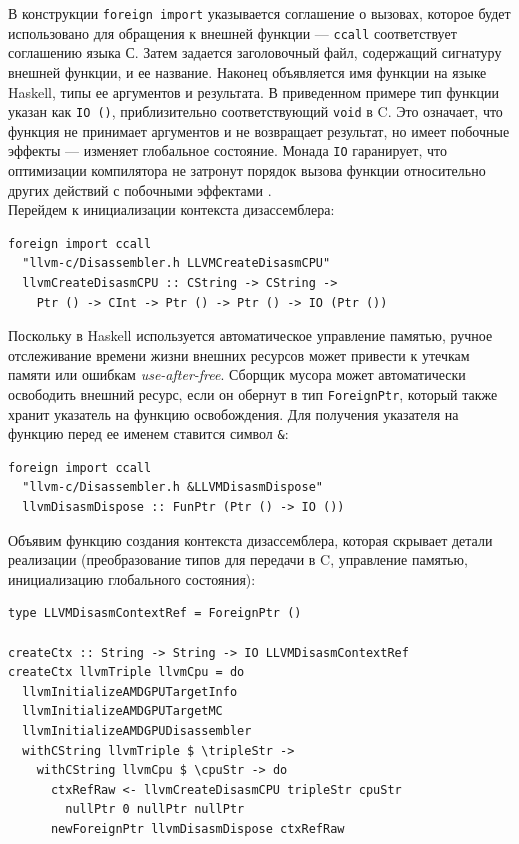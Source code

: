 \documentclass[a4paper,14pt]{extarticle}
\begin{document}
{В конструкции \verb|foreign import| указывается соглашение о вызовах, которое будет
использовано для обращения к внешней функции — \verb|ccall| соответствует соглашению языка С.
Затем задается заголовочный файл, содержащий сигнатуру внешней функции, и ее название.
Наконец объявляется имя функции на языке Haskell, типы ее аргументов и результата.
В приведенном примере тип функции указан как \verb|IO ()|, приблизительно соответствующий
\verb|void| в C. Это означает, что функция не принимает аргументов и не возвращает результат,
но имеет побочные эффекты — изменяет глобальное состояние.
Монада \verb|IO| гаранирует, что оптимизации компилятора не затронут порядок вызова функции
относительно других действий с побочными эффектами \cite[глава~7]{rwhaskell}.\\

Перейдем к инициализации контекста дизассемблера:
\begin{verbatim}
foreign import ccall
  "llvm-c/Disassembler.h LLVMCreateDisasmCPU"
  llvmCreateDisasmCPU :: CString -> CString ->
    Ptr () -> CInt -> Ptr () -> Ptr () -> IO (Ptr ())
\end{verbatim}

Поскольку в Haskell используется автоматическое управление памятью,
ручное отслеживание времени жизни внешних ресурсов
может привести к утечкам памяти или ошибкам \textit{use-after-free}.
Сборщик мусора может автоматически освободить внешний ресурс, если он
обернут в тип \verb|ForeignPtr|, который также хранит указатель на функцию
освобождения. Для получения указателя на функцию перед ее именем ставится символ \verb|&|:
\begin{verbatim}
foreign import ccall
  "llvm-c/Disassembler.h &LLVMDisasmDispose"
  llvmDisasmDispose :: FunPtr (Ptr () -> IO ())
\end{verbatim}

Объявим функцию создания контекста дизассемблера, которая скрывает детали
реализации (преобразование типов для передачи в C, управление памятью, инициализацию
глобального состояния):
\begin{verbatim}
type LLVMDisasmContextRef = ForeignPtr ()

createCtx :: String -> String -> IO LLVMDisasmContextRef
createCtx llvmTriple llvmCpu = do
  llvmInitializeAMDGPUTargetInfo
  llvmInitializeAMDGPUTargetMC
  llvmInitializeAMDGPUDisassembler
  withCString llvmTriple $ \tripleStr ->
    withCString llvmCpu $ \cpuStr -> do
      ctxRefRaw <- llvmCreateDisasmCPU tripleStr cpuStr
        nullPtr 0 nullPtr nullPtr
      newForeignPtr llvmDisasmDispose ctxRefRaw
\end{verbatim}

}
\end{document}
